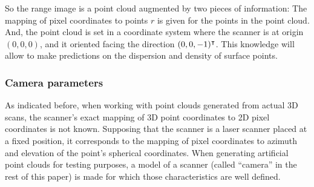 So the range image is a point cloud augmented by two pieces of information: The mapping of pixel coordinates to points $r$ is given for the points in the point cloud. And, the point cloud is set in a coordinate system where the scanner is at origin $(0, 0, 0)$, and it oriented facing the direction $(0, 0, -1)^\intercal$. This knowledge will allow to make predictions on the dispersion and density of surface points.

\subsubsection{Camera parameters}
As indicated before, when working with point clouds generated from actual 3D scans, the scanner's exact mapping of 3D point coordinates to 2D pixel coordinates is not known. Supposing that the scanner is a laser scanner placed at a fixed position, it corresponds to the mapping of pixel coordinates to azimuth and elevation of the point's spherical coordinates. When generating artificial point clouds for testing purposes, a model of a scanner (called ``camera'' in the rest of this paper) is made for which those characteristics are well defined.

